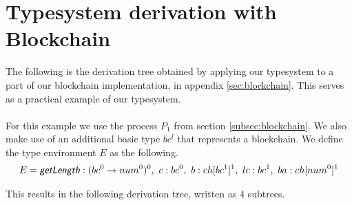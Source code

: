 \section{Typesystem derivation with Blockchain}
The following is the derivation tree obtained by applying our typesystem to a part of our blockchain implementation, in appendix \ref{sec:blockchain}.
This serves as a practical example of our typesystem.\\\\

For this example we use the process $P_1$ from section \ref{subsec:blockchain}.
We also make use of an additional basic type $bc^l$ that represents a blockchain.
We define the type environment $E$ as the following.
\begin{align*}
	E=\mop{getLength}:(bc^0\ra num^0)^0,\ c:bc^0,\ b:ch[bc^1]^1,\ lc:bc^1,\  ba:ch[num^0]^1
\end{align*}

This results in the following derivation tree, written as 4 subtrees.
\begin{prooftree}
\end{prooftree}
\vspace{10pt}
\begin{prooftree}
\end{prooftree}
\vspace{10pt}
\begin{prooftree}
\end{prooftree}
\vspace{10pt}
\begin{prooftree}
\end{prooftree}